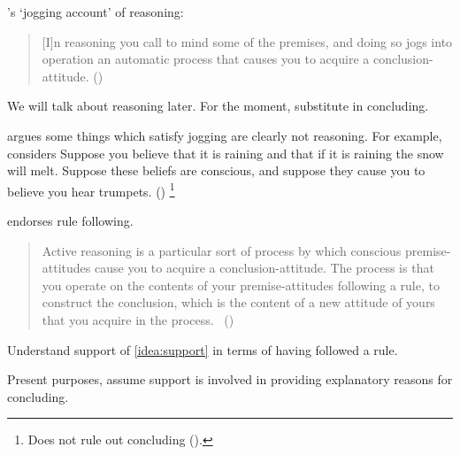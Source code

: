 \begin{note}
  \citeauthor{Broome:2002aa}'s `jogging account' of reasoning:

  \begin{quote}
    [I]n reasoning you call to mind some of the premises, and doing so jogs into operation an automatic process that causes you to acquire a conclusion-attitude.%
    \mbox{}\hfill\mbox{(\citeyear[226]{Broome:2002aa})}
  \end{quote}

  {
    \color{red}
    We will talk about reasoning later.
    For the moment, substitute in concluding.
    }

  \citeauthor{Broome:2002aa} argues some things which satisfy jogging are clearly not reasoning.
  For example, \citeauthor{Broome:2002aa} considers
  {
    \color{red}
    Suppose you believe that it is raining and that if it is raining the snow will melt. Suppose these beliefs are conscious, and suppose they cause you to believe you hear trumpets.
  }
  (\citeyear[225,226--227]{Broome:2002aa})%
  \footnote{
    Does not rule out concluding (\citeyear[231,233]{Broome:2002aa}).
  }

  \citeauthor{Broome:2002aa} endorses rule following.

  \begin{quote}
    Active reasoning is a particular sort of process by which conscious premise-attitudes cause you to acquire a conclusion-attitude.
    The process is that you operate on the contents of your premise-attitudes following a rule, to construct the conclusion, which is the content of a new attitude of yours that you acquire in the process.\newline
    \mbox{ }\hfill\mbox{(\citeyear[234]{Broome:2002aa})}
  \end{quote}

  Understand support of \autoref{idea:support} in terms of having followed a rule.
\end{note}

\begin{note}
  Present purposes, assume support is involved in providing explanatory reasons for concluding.
\end{note}

